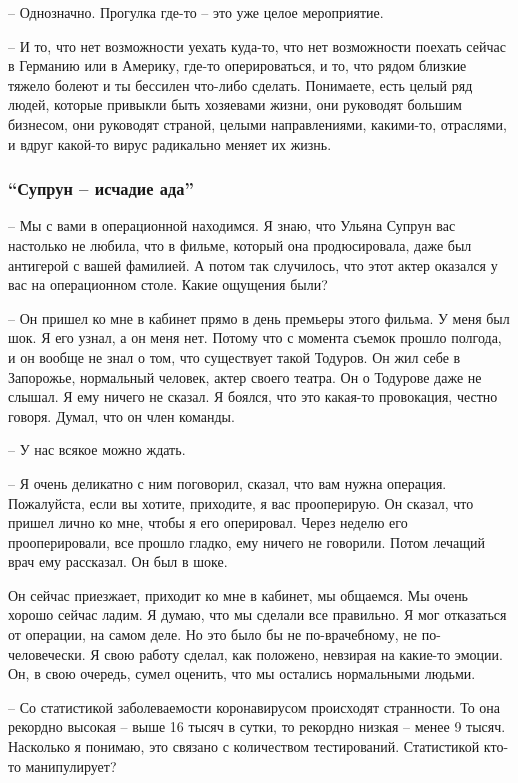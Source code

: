 – Однозначно. Прогулка где-то – это уже целое мероприятие.

– И то, что нет возможности уехать куда-то, что нет возможности поехать сейчас
в Германию или в Америку, где-то оперироваться, и то, что рядом близкие тяжело
болеют и ты бессилен что-либо сделать. Понимаете, есть целый ряд людей, которые
привыкли быть хозяевами жизни, они руководят большим бизнесом, они руководят
страной, целыми направлениями, какими-то, отраслями, и вдруг какой-то вирус
радикально меняет их жизнь.

\subsubsection{\enquote{Супрун – исчадие ада}}

– Мы с вами в операционной находимся. Я знаю, что Ульяна Супрун вас настолько
не любила, что в фильме, который она продюсировала, даже был антигерой с вашей
фамилией. А потом так случилось, что этот актер оказался у вас на операционном
столе. Какие ощущения были?

– Он пришел ко мне в кабинет прямо в день премьеры этого фильма. У меня был
шок. Я его узнал, а он меня нет. Потому что с момента съемок прошло полгода, и
он вообще не знал о том, что существует такой Тодуров. Он жил себе в Запорожье,
нормальный человек, актер своего театра. Он о Тодурове даже не слышал. Я ему
ничего не сказал. Я боялся, что это какая-то провокация, честно говоря. Думал,
что он член команды.

– У нас всякое можно ждать.

– Я очень деликатно с ним поговорил, сказал, что вам нужна операция.
Пожалуйста, если вы хотите, приходите, я вас прооперирую. Он сказал, что пришел
лично ко мне, чтобы я его оперировал. Через неделю его прооперировали, все
прошло гладко, ему ничего не говорили. Потом лечащий врач ему рассказал. Он был
в шоке.

Он сейчас приезжает, приходит ко мне в кабинет, мы общаемся. Мы очень хорошо
сейчас ладим. Я думаю, что мы сделали все правильно. Я мог отказаться от
операции, на самом деле. Но это было бы не по-врачебному, не по-человечески. Я
свою работу сделал, как положено, невзирая на какие-то эмоции. Он, в свою
очередь, сумел оценить, что мы остались нормальными людьми.

– Со статистикой заболеваемости коронавирусом происходят странности. То она
рекордно высокая – выше 16 тысяч в сутки, то рекордно низкая – менее 9 тысяч.
Насколько я понимаю, это связано с количеством тестирований. Статистикой кто-то
манипулирует? 

